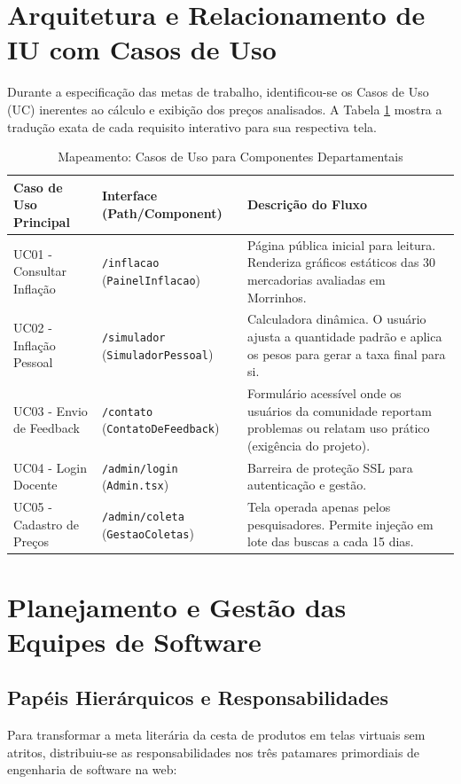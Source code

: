 \documentclass[12pt]{article}
\begin{document}
\section{Arquitetura e Relacionamento de IU com Casos de Uso}
Durante a especificação das metas de trabalho, identificou-se os Casos de Uso (UC) inerentes ao cálculo e exibição dos preços analisados. A Tabela \ref{tab:uc} mostra a tradução exata de cada requisito interativo para sua respectiva tela.

\begin{table}[H]
\centering
\caption{Mapeamento: Casos de Uso para Componentes Departamentais}
\label{tab:uc}
\begin{tabularx}{\textwidth}{|l|l|X|}
\hline
\textbf{Caso de Uso Principal} & \textbf{Interface (Path/Component)} & \textbf{Descrição do Fluxo} \\ \hline
UC01 - Consultar Inflação & \texttt{/inflacao} (\texttt{PainelInflacao}) & Página pública inicial para leitura. Renderiza gráficos estáticos das 30 mercadorias avaliadas em Morrinhos. \\ \hline
UC02 - Inflação Pessoal & \texttt{/simulador} (\texttt{SimuladorPessoal}) & Calculadora dinâmica. O usuário ajusta a quantidade padrão e aplica os pesos para gerar a taxa final para si. \\ \hline
UC03 - Envio de Feedback & \texttt{/contato} (\texttt{ContatoDeFeedback}) & Formulário acessível onde os usuários da comunidade reportam problemas ou relatam uso prático (exigência do projeto). \\ \hline
UC04 - Login Docente & \texttt{/admin/login} (\texttt{Admin.tsx}) & Barreira de proteção SSL para autenticação e gestão. \\ \hline
UC05 - Cadastro de Preços & \texttt{/admin/coleta} (\texttt{GestaoColetas}) & Tela operada apenas pelos pesquisadores. Permite injeção em lote das buscas a cada 15 dias. \\ \hline
\end{tabularx}
\end{table}

\section{Planejamento e Gestão das Equipes de Software}

\subsection{Papéis Hierárquicos e Responsabilidades}
Para transformar a meta literária da cesta de produtos em telas virtuais sem atritos, distribuiu-se as responsabilidades nos três patamares primordiais de engenharia de software na web:
\end{document}
